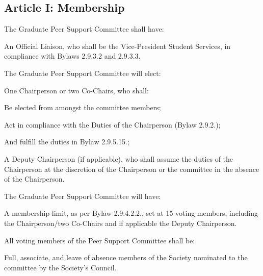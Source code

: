 \subsection{Article I: Membership}
\begin{longenum}[ label*=\thesubsection.\arabic*., align=left] 	
	\item The Graduate Peer Support Committee shall have:
		\begin{longenum}[label*=\arabic*., align=left]	
		\item An Official Liaison, who shall be the Vice-President Student Services, in compliance with Bylaws 2.9.3.2 and 2.9.3.3.
		\end{longenum}
	\item The Graduate Peer Support Committee will elect:
		\begin{longenum}[label*=\arabic*., align=left]
		\item One Chairperson or two Co-Chairs, who shall:
			\begin{longenum}[label*=\arabic*., align=left]
			\item Be elected from amongst the committee members;
			\item Act in compliance with the Duties of the Chairperson (Bylaw 2.9.2.);
			\item And fulfill the duties in Bylaw 2.9.5.15.;
			\end{longenum}
		\item A Deputy Chairperson (if applicable), who shall assume the duties of the Chairperson at the discretion of the Chairperson or the committee in the absence of the Chairperson.
		\end{longenum}
	\item The Graduate Peer Support Committee will have:
		\begin{longenum}[label*=\arabic*., align=left]
		\item A membership limit, as per Bylaw 2.9.4.2.2., set at 15 voting members, including the Chairperson/two Co-Chairs and if applicable the Deputy Chairperson.
		\end{longenum}
	\item All voting members of the Peer Support Committee shall be:
		\begin{longenum}[label*=\arabic*., align=left]
		\item Full, associate, and leave of absence members of the Society nominated to the committee by the Society’s Council.   
		\end{longenum}
\end{longenum}

